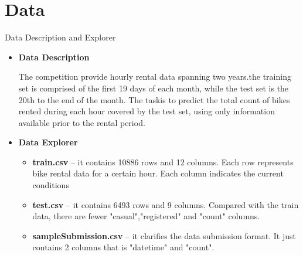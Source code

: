 \documentclass[
 size=14pt,
 paper=smartboard,  %
 mode=present, 		%
 display=slides, 	%
 style=tuliplab,  	%
 pauseslide,
 fleqn,leqno]{powerdot}
\begin{document}
\section{Data}

\begin{slide}{Data Description and Explorer}

\begin{itemize}
	\item \textbf{Data Description}
	
	\medskip
	The competition provide hourly rental data spanning two years.the training set is comprised of the first 19 days of each month, while the test set is the 20th to the end of the month.
	The taskis to predict the total count of bikes rented during each hour covered by the test set, using only information available prior to the rental period.
	
	\bigskip
	\item \textbf{Data Explorer}
	
	\begin{itemize}
		\smallskip
		\item \textbf{train.csv} -- it contains 10886 rows and 12 columns. Each row represents bike rental data for a certain hour. Each column indicates the current conditions
		\smallskip
		\item \textbf{test.csv} -- it contains 6493 rows and 9 columns. Compared with the train data, there are fewer "casual","registered" and "count" columns.
		\smallskip
		\item \textbf{sampleSubmission.csv} -- it clarifies the data submission format. It just contains 2 columns that is "datetime" and "count".
	\end{itemize}
	
\end{itemize}

\end{slide}
\end{document}
